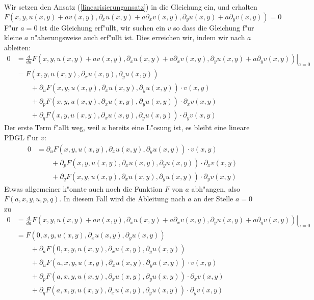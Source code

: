 Wir setzen den Ansatz (\ref{linearisierungansatz}) in die Gleichung
ein, und erhalten
$$
F(x,y,u(x,y)+av(x,y),\partial_xu(x,y)+a\partial_xv(x,y),
\partial_yu(x,y)+a\partial_yv(x,y))=0
$$
F"ur $a=0$ ist die Gleichung erf"ullt, wir suchen ein $v$ so dass die Gleichung
f"ur kleine $a$ n"aherungsweise auch erf"ullt ist. Dies erreichen wir,
indem wir nach $a$ ableiten:
\begin{align*}
0&=
\left.\frac{d}{da}
F(x,y,u(x,y)+av(x,y),\partial_xu(x,y)+a\partial_xv(x,y),
\partial_yu(x,y)+a\partial_yv(x,y))\right|_{a=0}
\\
&=F(x,y,u(x,y),\partial_xu(x,y),\partial_yu(x,y))
\\
&\qquad
+
\partial_uF(x,y,u(x,y),\partial_xu(x,y),\partial_yu(x,y))\cdot v(x,y)
\\
&\qquad
+
\partial_pF(x,y,u(x,y),\partial_xu(x,y),\partial_yu(x,y))\cdot \partial_xv(x,y)
\\
&\qquad
+
\partial_qF(x,y,u(x,y),\partial_xu(x,y),\partial_yu(x,y))\cdot \partial_yv(x,y)
\end{align*}
Der erste Term f"allt weg, weil $u$ bereits eine L"osung ist,
es bleibt eine lineare PDGL f"ur $v$:
\begin{align*}
0&=
\partial_uF(x,y,u(x,y),\partial_xu(x,y),\partial_yu(x,y))\cdot v(x,y)
\\
&\qquad
+
\partial_pF(x,y,u(x,y),\partial_xu(x,y),\partial_yu(x,y))\cdot \partial_xv(x,y)
\\
&\qquad
+
\partial_qF(x,y,u(x,y),\partial_xu(x,y),\partial_yu(x,y))\cdot \partial_yv(x,y)
\end{align*}
Etwas allgemeiner k"onnte auch noch die Funktion $F$ von $a$ abh"angen,
also $F(a,x,y,u,p,q)$. In diesem Fall wird die Ableitung nach $a$ an
der Stelle $a=0$ zu
\begin{align*}
0&=
\left.\frac{d}{da}
F(x,y,u(x,y)+av(x,y),\partial_xu(x,y)+a\partial_xv(x,y),
\partial_yu(x,y)+a\partial_yv(x,y))\right|_{a=0}
\\
&=
F(0,x,y,u(x,y),\partial_xu(x,y),\partial_yu(x,y))
\\
&\qquad
+\partial_aF(0,x,y,u(x,y),\partial_xu(x,y),\partial_yu(x,y))
\\
&\qquad
+
\partial_uF(a,x,y,u(x,y),\partial_xu(x,y),\partial_yu(x,y))\cdot v(x,y)
\\
&\qquad
+
\partial_pF(a,x,y,u(x,y),\partial_xu(x,y),\partial_yu(x,y))\cdot \partial_xv(x,y)
\\
&\qquad
+
\partial_qF(a,x,y,u(x,y),\partial_xu(x,y),\partial_yu(x,y))\cdot \partial_yv(x,y)
\end{align*}
